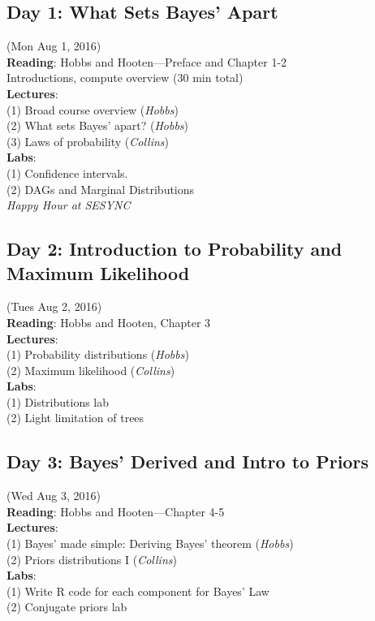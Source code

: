\documentclass[12pt, oneside]{article}
\begin{document}
\subsection*{Day 1: What Sets Bayes' Apart} (Mon Aug 1, 2016) \\
\textbf{Reading}: Hobbs and Hooten---Preface and Chapter 1-2\\
Introductions, compute overview (30 min total) \\
\textbf{Lectures}: \\
(1) Broad course overview (\emph{Hobbs})\\
(2) What sets Bayes' apart?  (\emph{Hobbs})\\
(3) Laws of probability (\emph{Collins})\\
\textbf{Labs}: \\
(1) Confidence intervals.\\
(2) DAGs and Marginal Distributions\\
\emph{Happy Hour at SESYNC}


\subsection*{Day 2: Introduction to Probability and Maximum Likelihood} (Tues Aug 2, 2016)\\
\textbf{Reading}: Hobbs and Hooten, Chapter 3\\
\textbf{Lectures}: \\
(1) Probability distributions  (\emph{Hobbs})\\
(2) Maximum likelihood (\emph{Collins})\\
\textbf{Labs}: \\
(1) Distributions lab\\
(2) Light limitation of trees\\	

\subsection*{Day 3: Bayes' Derived and Intro to Priors} (Wed Aug 3, 2016)\\
\textbf{Reading}: Hobbs and Hooten---Chapter 4-5\\
\textbf{Lectures}: \\
(1) Bayes' made simple: Deriving Bayes' theorem (\emph{Hobbs})\\
(2) Priors distributions I (\emph{Collins}) \\
\textbf{Labs}: \\
(1) Write R code for each component for Bayes' Law \\	
(2) Conjugate priors lab\\
\end{document}
